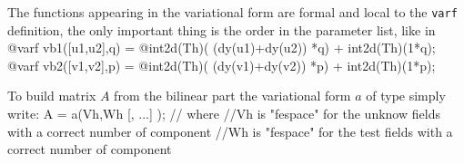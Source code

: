 \documentclass[a4paper,twoside,12pt]{book}
\begin{document}
\begin{note} \label{varf param}
 The functions appearing in the variational form are formal and local to the \texttt{varf} definition,
  the only important thing is the order in the parameter list, like in
\bFF
 @varf vb1([u1,u2],q) = @int2d(Th)( (dy(u1)+dy(u2)) *q) + int2d(Th)(1*q);
 @varf vb2([v1,v2],p) = @int2d(Th)( (dy(v1)+dy(v2)) *p) + int2d(Th)(1*p);
\eFF
\end{note}

To build matrix $A$ from the bilinear part the variational form $a$ of type   simply write:
\bFF
  A = a(Vh,Wh [, ...] );
 // where \hfilll
 //Vh is "fespace" for the unknow fields  with a correct number of component\hfilll
 //Wh is "fespace" for the test fields  with a correct number of component\hfilll
\eFF
\end{document}
